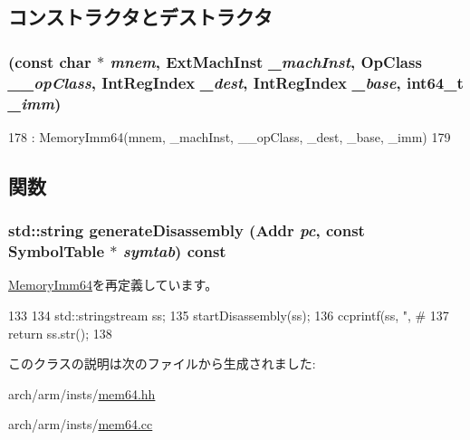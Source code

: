 \subsection{コンストラクタとデストラクタ}
\hypertarget{classArmISA_1_1MemoryPreIndex64_a24b57e9206d5af0674cabdba46feba58}{
\subsubsection[{MemoryPreIndex64}]{ (const char $\ast$ {\em mnem}, \/  {\bf ExtMachInst} {\em \_\-machInst}, \/  OpClass {\em \_\-\_\-opClass}, \/  {\bf IntRegIndex} {\em \_\-dest}, \/  {\bf IntRegIndex} {\em \_\-base}, \/  int64\_\-t {\em \_\-imm})}}
\label{classArmISA_1_1MemoryPreIndex64_a24b57e9206d5af0674cabdba46feba58}



\begin{DoxyCode}
178         : MemoryImm64(mnem, _machInst, __opClass, _dest, _base, _imm)
179     {}
\end{DoxyCode}


\subsection{関数}
\hypertarget{classArmISA_1_1MemoryPreIndex64_a95d323a22a5f07e14d6b4c9385a91896}{
\subsubsection[{generateDisassembly}]{\setlength{\rightskip}{0pt plus 5cm}std::string generateDisassembly ({\bf Addr} {\em pc}, \/  const SymbolTable $\ast$ {\em symtab}) const}}
\label{classArmISA_1_1MemoryPreIndex64_a95d323a22a5f07e14d6b4c9385a91896}


\hyperlink{classArmISA_1_1MemoryImm64_a95d323a22a5f07e14d6b4c9385a91896}{MemoryImm64}を再定義しています。


\begin{DoxyCode}
133 {
134     std::stringstream ss;
135     startDisassembly(ss);
136     ccprintf(ss, ", #%
137     return ss.str();
138 }
\end{DoxyCode}


このクラスの説明は次のファイルから生成されました:\begin{DoxyCompactItemize}
\item 
arch/arm/insts/\hyperlink{mem64_8hh}{mem64.hh}\item 
arch/arm/insts/\hyperlink{mem64_8cc}{mem64.cc}\end{DoxyCompactItemize}
